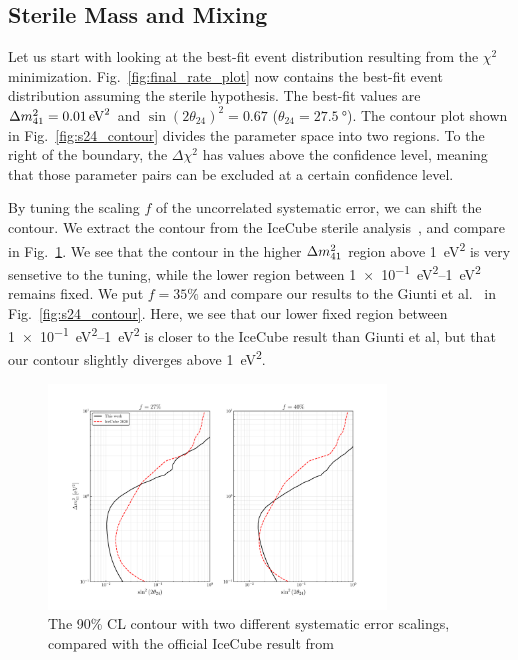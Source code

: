 \subsection{Sterile Mass and Mixing}
Let us start with looking at the best-fit event distribution resulting from the $\chi^2$ minimization.
Fig.~\ref{fig:final_rate_plot} now contains the best-fit event distribution assuming the sterile hypothesis.
The best-fit values are $\dm[41] = \SI{0.01}{\eV\squared}$ and 
$\sin(2\theta_{24})^2 = 0.67$ ($\theta_{24} = \SI{27.5}{\degree}$). %
The contour plot shown in Fig.~\ref{fig:s24_contour} divides the parameter space into two regions.
To the right of the boundary, the $\Delta \chi^2$ has values above the confidence level, meaning that 
those parameter pairs can be excluded at a certain confidence level.

By tuning the scaling $f$ of the uncorrelated systematic error, we can shift the contour. We extract the contour from the 
IceCube sterile analysis~\cite{IC2020}, and compare in Fig.~\ref{fig:error_tuning}. We see that the contour in the 
higher $\dm[41]$ region above \SI{1}{\eV\squared} is very sensetive to the tuning, while the lower region between \SIrange[]{1e-1}{1}{\eV\squared}
remains fixed. We put $f=35\%$ and compare our results to the Giunti et al.~\cite{gariazzoUpdatedGlobalAnalysis2017} in Fig.~\ref{fig:s24_contour}. %
Here, we see that our lower fixed region between \SIrange{1e-1}{1}{\eV\squared} is closer to the IceCube result than Giunti et al, but that 
our contour slightly diverges above \SI{1}{\eV\squared}. 
\begin{figure}
    \centering
    \includegraphics[width=0.8\textwidth]{figures/s24_error_tuning.pdf}
    \caption{The 90\% CL contour with two different systematic error scalings, compared 
    with the official IceCube result from~\cite{IC2020}}\label{fig:error_tuning}
\end{figure}

